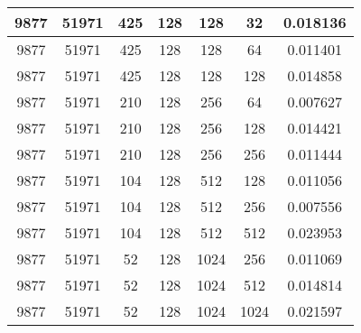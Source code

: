 \documentclass[9pt]{article}
\begin{document}
\begin{tabular}{|c|c|c|c|c|c|c| }
\hline
9877  & 51971  & 425  & 128  & 128  & 32  & 0.018136 \\
\hline
9877  & 51971  & 425  & 128  & 128  & 64  & 0.011401 \\
\hline
9877  & 51971  & 425  & 128  & 128  & 128  & 0.014858 \\
\hline
9877  & 51971  & 210  & 128  & 256  & 64  & 0.007627 \\
\hline
9877  & 51971  & 210  & 128  & 256  & 128  & 0.014421 \\
\hline
9877  & 51971  & 210  & 128  & 256  & 256  & 0.011444 \\
\hline
9877  & 51971  & 104  & 128  & 512  & 128  & 0.011056 \\
\hline
9877  & 51971  & 104  & 128  & 512  & 256  & 0.007556 \\
\hline
9877  & 51971  & 104  & 128  & 512  & 512  & 0.023953 \\
\hline
9877  & 51971  & 52  & 128  & 1024  & 256  & 0.011069 \\
\hline
9877  & 51971  & 52  & 128  & 1024  & 512  & 0.014814 \\
\hline
9877  & 51971  & 52  & 128  & 1024  & 1024  & 0.021597 \\
\hline
\end{tabular}
 
\end{document}
